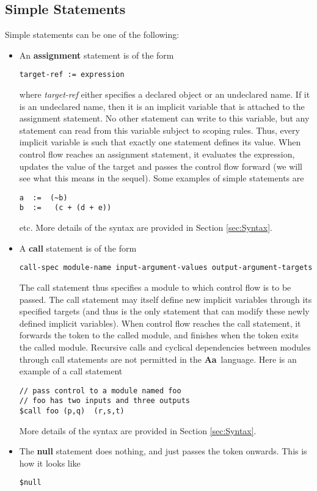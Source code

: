 \documentclass{article}
\newcommand{\Aa}{{\bf Aa}~}
\begin{document}
\subsection{Simple Statements}

Simple statements can be one of the following:
\begin{itemize}
\item An {\bf assignment} statement is of the form
\begin{verbatim}
target-ref := expression
\end{verbatim}
where {\em target-ref} either specifies a declared object
or an undeclared name.  If it is an undeclared name, then
it is an implicit variable that is attached to the
assignment statement.  No other statement can write to this
variable, but any statement can read from this variable
subject to scoping rules.  Thus, every implicit variable
is such that exactly one statement defines its value.
When control flow reaches an assignment statement, it
evaluates the expression, updates the value of the target
and passes the control flow forward (we will see what this
means in the sequel).
Some examples of simple statements are 
\begin{verbatim}
a  :=  (~b)
b  :=   (c + (d + e))
\end{verbatim}
etc.  
More details of the syntax are provided in 
Section \ref{sec:Syntax}.
\item A {\bf call} statement is of the form
\begin{verbatim}
call-spec module-name input-argument-values output-argument-targets
\end{verbatim}
The call statement thus specifies a module to which control flow
is to be passed.  The call statement may itself define new implicit
variables through its specified targets (and thus is the only
statement that can modify these newly defined implicit variables).
When control flow reaches the call statement, it forwards the
token to the called module, and finishes when the token exits
the called module.  Recursive calls and cyclical dependencies between
modules through call statements are not permitted in the \Aa language.
Here is an example of a call statement
\begin{verbatim}
// pass control to a module named foo
// foo has two inputs and three outputs
$call foo (p,q)  (r,s,t)
\end{verbatim}
More details of the syntax are provided in 
Section \ref{sec:Syntax}.
\item The {\bf null} statement does nothing, and just passes the
token onwards.  This is how it looks like
\begin{verbatim}
$null
\end{verbatim}
\end{itemize}
\end{document}
